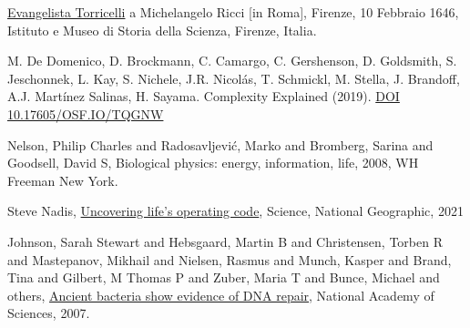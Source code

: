 
\cleardoublepage
{}
\begin{thebibliography}{99}

%
%

\href{http://www.imss.fi.it/multi/torricel/le100246.html}{Evangelista Torricelli} a Michelangelo Ricci [in Roma], Firenze, 10 Febbraio 1646,
Istituto e Museo di Storia della Scienza, Firenze, Italia.

M. De Domenico, D. Brockmann, C. Camargo, C. Gershenson, D. Goldsmith, S. Jeschonnek, L. Kay, S. Nichele, J.R. Nicolás, T. Schmickl, M. Stella, J. Brandoff, A.J. Martínez Salinas, H. Sayama. Complexity Explained (2019). \href{https://complexityexplained.github.io/}{DOI 10.17605/OSF.IO/TQGNW}

Nelson, Philip Charles and Radosavljevi{\'c}, Marko and Bromberg, Sarina and Goodsell, David S, Biological physics: energy, information, life, 2008, WH Freeman New York.

Steve Nadis, \href{https://www.nationalgeographic.com/science/article/uncovering-lifes-operating-code}{Uncovering life's operating code}, Science, National Geographic, 2021

Johnson, Sarah Stewart and Hebsgaard, Martin B and Christensen, Torben R and Mastepanov, Mikhail and Nielsen, Rasmus and Munch, Kasper and Brand, Tina and Gilbert, M Thomas P and Zuber, Maria T and Bunce, Michael and others, \href{https://www.pnas.org/doi/10.1073/pnas.0706787104}{Ancient bacteria show evidence of DNA repair}, National Academy of Sciences, 2007.


 
 

\end{thebibliography}
